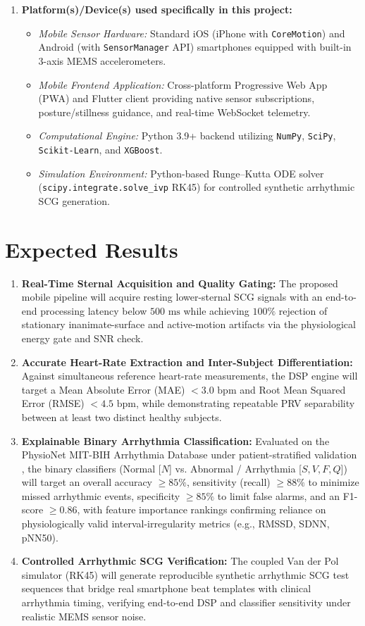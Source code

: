 \begin{enumerate}
	\item \textbf{Platform(s)/Device(s) used specifically in this project:}
	\begin{itemize}
		\item \textit{Mobile Sensor Hardware:} Standard iOS (iPhone with \texttt{CoreMotion}) and Android (with \texttt{SensorManager} API) smartphones equipped with built-in 3-axis MEMS accelerometers.
		\item \textit{Mobile Frontend Application:} Cross-platform Progressive Web App (PWA) and Flutter client providing native sensor subscriptions, posture/stillness guidance, and real-time WebSocket telemetry.
		\item \textit{Computational Engine:} Python 3.9+ backend utilizing \texttt{NumPy}, \texttt{SciPy}, \texttt{Scikit-Learn}, and \texttt{XGBoost}.
		\item \textit{Simulation Environment:} Python-based Runge--Kutta ODE solver (\texttt{scipy.integrate.solve\_ivp} RK45) for controlled synthetic arrhythmic SCG generation.
	\end{itemize}
\end{enumerate}

\section{Expected Results}
\begin{enumerate}
	\item \textbf{Real-Time Sternal Acquisition and Quality Gating:} The proposed mobile pipeline will acquire resting lower-sternal SCG signals with an end-to-end processing latency below $500\text{ ms}$ while achieving $100\%$ rejection of stationary inanimate-surface and active-motion artifacts via the physiological energy gate and SNR check.
	\item \textbf{Accurate Heart-Rate Extraction and Inter-Subject Differentiation:} Against simultaneous reference heart-rate measurements, the DSP engine will target a Mean Absolute Error (MAE) $< 3.0\text{ bpm}$ and Root Mean Squared Error (RMSE) $< 4.5\text{ bpm}$, while demonstrating repeatable PRV separability between at least two distinct healthy subjects.
	\item \textbf{Explainable Binary Arrhythmia Classification:} Evaluated on the PhysioNet MIT-BIH Arrhythmia Database \cite{goldberger2000physiobank} under patient-stratified validation \cite{pandian2026internet}, the binary classifiers (Normal [$N$] vs. Abnormal / Arrhythmia [$S, V, F, Q$]) will target an overall accuracy $\ge 85\%$, sensitivity (recall) $\ge 88\%$ to minimize missed arrhythmic events, specificity $\ge 85\%$ to limit false alarms, and an F1-score $\ge 0.86$, with feature importance rankings confirming reliance on physiologically valid interval-irregularity metrics (e.g., RMSSD, SDNN, pNN50).
	\item \textbf{Controlled Arrhythmic SCG Verification:} The coupled Van der Pol simulator (RK45) will generate reproducible synthetic arrhythmic SCG test sequences that bridge real smartphone beat templates with clinical arrhythmia timing, verifying end-to-end DSP and classifier sensitivity under realistic MEMS sensor noise.
\end{enumerate}

